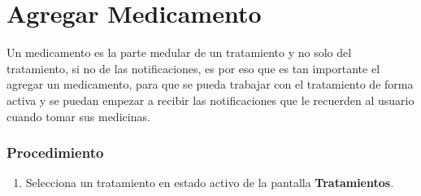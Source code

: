 \section{Agregar Medicamento}

Un medicamento es la parte medular de un tratamiento y no solo del tratamiento, si no de las notificaciones, es por eso que es tan importante el agregar un medicamento, para que se pueda trabajar con el tratamiento de forma activa y se puedan empezar a recibir las notificaciones que le recuerden al usuario cuando tomar sus medicinas.

\subsubsection{Procedimiento}
\begin{enumerate}
	
	\item Selecciona un tratamiento en estado activo de la pantalla \textbf{Tratamientos}.


\end{enumerate}
